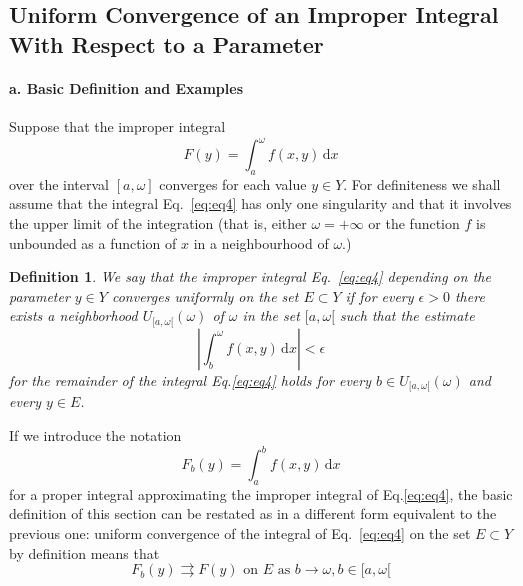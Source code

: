 \documentclass[a4paper,12pt]{article}
\newtheorem{definition}{Definition}
\begin{document}
\begin{CJK}{UTF8}{gbsn}
    \subsection{Uniform Convergence of an Improper Integral With Respect 
    to a Parameter}
    \paragraph{\textbf{a. Basic Definition and Examples}}
    Suppose that the improper integral 
    \begin{equation}
        F(y) = \int_a^{\omega}f(x,y)\,\mathrm{d}x
        \label{eq:eq4}
    \end{equation}
    over the interval $[a,\omega]$ converges for each value $y \in Y$. For 
    definiteness we shall assume that the integral Eq.~\ref{eq:eq4}
    has only one singularity and that it involves the upper limit 
    of the integration (that is, either $\omega = +\infty$ or the function $f$ is unbounded 
    as a function of $x$ in a neighbourhood of $\omega$.)

    \begin{definition}
        We say that the improper integral Eq.~\ref{eq:eq4} depending on 
        the parameter $y \in Y$ converges uniformly on the set $E \subset Y$
        if for every $\epsilon > 0$ there exists a neighborhood $U_{[a,\omega[}(\omega)$
        of $\omega$ in the set $[a,\omega[$ such that the estimate
        \begin{equation}
            \left | \int_b^\omega f(x,y)\, \mathrm{d}x \right | < \epsilon
            \label{eq:eq5}
        \end{equation}
        for the remainder of the integral Eq.\ref{eq:eq4} holds for every 
        $b \in U_{[a,\omega[}(\omega)$ and every $y \in E$.
    \end{definition}

    If we introduce the notation 
    \begin{equation}
        F_b(y) = \int_a^bf(x,y)\, \mathrm{d}x
        \label{eq:eq6}
    \end{equation}
    for a proper integral approximating the improper integral of 
    Eq.\ref{eq:eq4}, the basic definition of this section can be restated as 
    in a different form equivalent to the previous one:
    uniform convergence of the integral of Eq.~\ref{eq:eq4} on the set 
    $E \subset Y$ by definition means that 
    \begin{equation}
        F_b(y) \rightrightarrows F(y) \text{ on } E \text{ as } b \to \omega, b \in [a,\omega[
    \end{equation}


\end{CJK}
\end{document}
